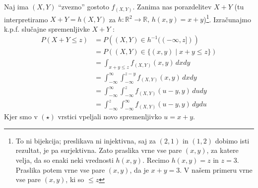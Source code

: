 \documentclass[12pt]{book}
\theoremstyle{definition}
\theoremstyle{plain}
\theoremstyle{plain}
\theoremstyle{plain}
\theoremstyle{plain}
\theoremstyle{remark}
\begin{document}
\begin{zgled}
    Naj ima $(X,Y)$ “zvezno” gostoto $f_{(X,Y)}$. Zanima nas porazdelitev $X+Y$ (tu interpretiramo $X+Y = h(X,Y)$ za $h: \mathbb{R}^2 \rightarrow \mathbb{R}, \, h(x, y)=x+y$)\footnote[5]{To ni bijekcija; preslikava ni injektivna, saj za $(2, 1)$ in $(1, 2)$ dobimo isti rezultat, je pa surjektivna. Zato praslika vrne vse pare $(x,y)$, za katere velja, da so enaki neki vrednosti $h(x,y)$. Recimo $h(x,y)=z$ in $z=3$. Praslika potem vrne vse pare $(x,y)$, da je $x+y=3$. V našem primeru vrne vse pare $(x,y)$, ki so $\leq z$}. Izračunajmo k.p.f. slučajne spremenljivke $X+Y$ :
    \begin{align*}
        P(X+Y \leq z) &= P\left((X, Y) \in h^{-1}((-\infty, z])\right) \\ 
        &= P((X, Y) \in\{(x, y) \mid x+y \leq z\}) \\
        &= \int_{x+y \leq z} f_{(X, Y)}(x, y) \,d x d y \\
        &=\int_{-\infty}^{\infty} \int_{-\infty}^{z-y} f_{(X, Y)}(x, y) \, d x d y \tag{$\star$} \\
        &=\int_{-\infty}^{\infty} \int_{-\infty}^z f_{(X, Y)}(u-y, y) \, d u d y \\
        &=\int_{-\infty}^z \int_{-\infty}^{\infty} f_{(X, Y)}(u-y, y) \, d y d u
    \end{align*}
    Kjer smo v $(\star)$ vrstici vpeljali novo spremenljivko $u=x+y$. 

    \begin{figure}[H]
        \centering
\end{figure}
\end{zgled}
\end{document}
